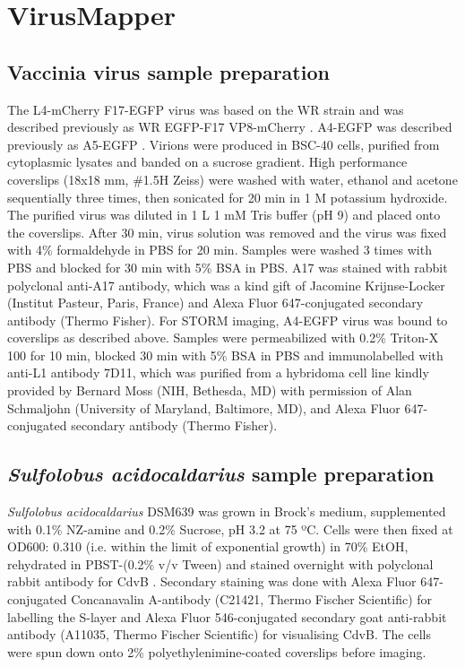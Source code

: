 \section{VirusMapper}

\subsection{Vaccinia virus sample preparation}
 
The L4-mCherry F17-EGFP virus was based on the WR strain and was described previously as WR EGFP-F17 VP8-mCherry \cite{schmidt2013vaccinia}. A4-EGFP was described previously as A5-EGFP \cite{schmidt2011vaccinia}. Virions were produced in BSC-40 cells, purified from cytoplasmic lysates and banded on a sucrose gradient. High performance coverslips (18x18 mm, \#1.5H Zeiss) were washed with water, ethanol and acetone sequentially three times, then sonicated for 20 min in 1 M potassium hydroxide. The purified virus was diluted in 1 \textmu{}L 1 mM Tris buffer (pH 9) and placed onto the coverslips. After 30 min, virus solution was removed and the virus was fixed with 4\% formaldehyde in PBS for 20 min. Samples were washed 3 times with PBS and blocked for 30 min with 5\% BSA in PBS. A17 was stained with rabbit polyclonal anti-A17 antibody, which was a kind gift of Jacomine Krijnse-Locker (Institut Pasteur, Paris, France) and Alexa Fluor 647-conjugated secondary antibody (Thermo Fisher). For STORM imaging, A4-EGFP virus was bound to coverslips as described above. Samples were permeabilized with 0.2\% Triton-X 100 for 10 min, blocked 30 min with 5\% BSA in PBS and immunolabelled with anti-L1 antibody 7D11, which was purified from a hybridoma cell line kindly provided by Bernard Moss (NIH, Bethesda, MD) with permission of Alan Schmaljohn (University of Maryland, Baltimore, MD), and Alexa Fluor 647-conjugated secondary antibody (Thermo Fisher). 

\subsection{\textit{Sulfolobus acidocaldarius} sample preparation}

\textit{Sulfolobus acidocaldarius} DSM639 was grown in Brock’s medium, supplemented with 0.1\% NZ-amine and 0.2\% Sucrose, pH 3.2 at 75 ºC. Cells were then fixed at OD600: 0.310 (i.e. within the limit of exponential growth) in 70\% EtOH, rehydrated in PBST-(0.2\% v/v Tween) and stained overnight with polyclonal rabbit antibody for CdvB \cite{lindaas2008unique}. Secondary staining was done with Alexa Fluor 647-conjugated Concanavalin A-antibody (C21421, Thermo Fischer Scientific) for labelling the S-layer and Alexa Fluor 546-conjugated secondary goat anti-rabbit antibody (A11035, Thermo Fischer Scientific) for visualising CdvB. The cells were spun down onto 2\% polyethylenimine-coated coverslips before imaging.
 
